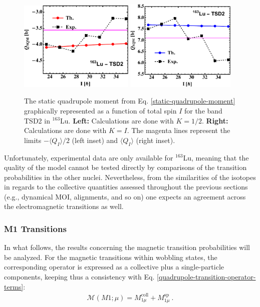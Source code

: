 \begin{figure}
    \centering
    \includegraphics[width=0.49\textwidth]{Chapters/Figures/Q_SQM_163Lu-3.pdf}
    \includegraphics[width=0.47\textwidth]{Chapters/Figures/Q_SQM_163Lu-4.pdf}
    \caption{The static quadrupole moment from Eq. \ref{static-quadrupole-moment} graphically represented as a function of total spin $I$ for the band TSD2 in $^{163}$Lu. \textbf{Left:} Calculations are done with $K=1/2$. \textbf{Right:} Calculations are done with $K=I$. The magenta lines represent the limits $-\langle Q_I\rangle/2$ (left inset) and $\langle Q_I\rangle$ (right inset).}
    \label{static-quadrupole-fixed-K-TSD2}
\end{figure}

Unfortunately, experimental data are only available for $^{163}$Lu, meaning that the quality of the model cannot be tested directly by comparisons of the transition probabilities in the other nuclei. Nevertheless, from the similarities of the isotopes in regards to the collective quantities assessed throughout the previous sections (e.g., dynamical MOI, alignments, and so on) one expects an agreement across the electromagnetic transitions as well.

\subsubsection{M1 Transitions}

In what follows, the results concerning the magnetic transition probabilities will be analyzed. For the magnetic transitions within wobbling states, the corresponding operator is expressed as a collective plus a single-particle components, keeping thus a consistency with Eq. \ref{quadrupole-transition-operator-terms}:
\begin{align}
    \mathcal{M}(M1;\mu)=M_{1\mu}^\text{coll}+M_{1\mu}^\text{sp}\ .
    \label{dipole-transition-operator-terms}
\end{align}


